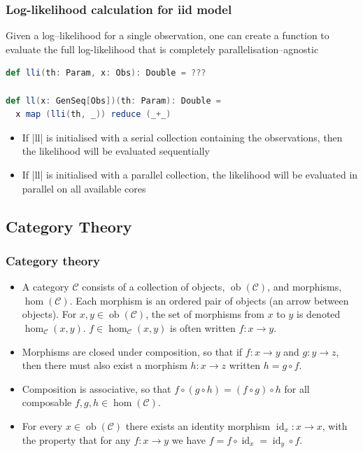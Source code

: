 \documentclass[mathserif,handout]{beamer}
\begin{document}
\begin{frame}[fragile]
  \frametitle{Log-likelihood calculation for iid model}
Given a log--likelihood for a single observation, one can create a function to evaluate the full log-likelihood that is completely \alert{parallelisation--agnostic}
\begin{lstlisting}[language=scala]
def lli(th: Param, x: Obs): Double = ???

def ll(x: GenSeq[Obs])(th: Param): Double =
  x map (lli(th, _)) reduce (_+_)
\end{lstlisting}
\begin{itemize}
\item If |ll| is initialised with a serial collection containing the observations, then the likelihood will be evaluated sequentially
\item If |ll| is initialised with a parallel collection, the likelihood will be evaluated in parallel on all available cores
\end{itemize}
\end{frame}



\subsection{Category Theory}

\begin{frame}[fragile]
  \frametitle{Category theory}
  \begin{itemize}
  \item A category $\mathcal{C}$ consists of a collection of \alert{objects}, $\operatorname{ob}(\mathcal{C})$, and \alert{morphisms}, $\operatorname{hom}(\mathcal{C})$. Each morphism is an ordered pair of objects (an arrow between objects). For $x,y\in \operatorname{ob}(\mathcal{C})$, the set of morphisms from $x$ to $y$ is denoted $\operatorname{hom}_{\mathcal{C}}(x,y)$. $f\in \operatorname{hom}_{\mathcal{C}}(x,y)$ is often written $f: x \longrightarrow y$.
  \item Morphisms are closed under \alert{composition}, so that if $f: x\longrightarrow y$ and $g: y\longrightarrow z$, then there must also exist a morphism $h: x\longrightarrow z$ written $h=g \circ f$.
  \item Composition is associative, so that $f\circ(g\circ h) = (f\circ g)\circ h$ for all composable $f, g, h\in \operatorname{hom}(\mathcal{C})$.
    \item For every $x\in \operatorname{ob}(\mathcal{C})$ there exists an \alert{identity} morphism $\operatorname{id}_x: x\longrightarrow x$, with the property that for any $f: x\longrightarrow y$ we have $f = f\circ \operatorname{id}_x = \operatorname{id}_y\circ f$.
  \end{itemize}
\end{frame}
\end{document}
